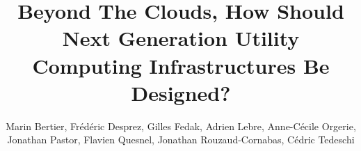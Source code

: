 \documentclass[graybox]{svmult}
\begin{document}
\title*{Beyond The Clouds, How Should Next Generation Utility Computing Infrastructures Be Designed?}
\author{Marin Bertier, Frédéric Desprez, Gilles Fedak, Adrien Lebre, Anne-Cécile
  Orgerie, Jonathan Pastor, Flavien Quesnel, Jonathan Rouzaud-Cornabas, Cédric Tedeschi}
%
%
\maketitle
\end{document}
